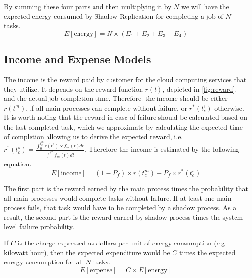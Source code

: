 By summing these four parts and then multiplying it by $N$ we will have
the expected energy consumed by Shadow Replication for completing a
job of $N$ tasks.
\begin{equation}
E[\text{energy}]=N \times (E_1 + E_2 + E_3 + E_4)
\label{eq:total_energy}
\end{equation}

\subsection{Income and Expense Models}
The income is the reward paid by customer for the cloud computing
services that they utilize. It depends on the reward function $r(t)$,
depicted in \ref{fig:reward}, and the actual job completion
time. Therefore, the income should be either $r(t_c^m)$, if all main
processes can complete without failure, or $r^*(t_c^s)$ otherwise. It
is worth noting that the reward in case of failure should be
calculated based on the last completed task, which we approximate by
calculating the expected time of completion allowing us to derive the
expected reward, i.e. $r^*(t_c^s)=\frac{\int_0^{t_c^m}r(t_c^s) \times
f_m(t)dt}{\int_0^{t_c^m}f_m(t)dt}$. Therefore the income is estimated
by the following equation.
\begin{equation}
E[\text{income}]= (1-P_f) \times r(t_c^m) + P_f \times r^*(t_c^s)
\end{equation}

The first part is the reward earned by the main process times the
probability that all main processes would complete tasks without
failure. If at least one main process fails, that task would have to
be completed by a shadow process. As a result, the second part is the
reward earned by shadow process times the system level failure probability.

If $C$ is the charge expressed as dollars per unit of energy consumption
(e.g. kilowatt hour), then the expected expenditure would be $C$ times
the expected energy consumption for all $N$ tasks:
\begin{equation}
E[\text{expense}] = C \times E[\text{energy}]
\label{eq:expense}
\end{equation}


